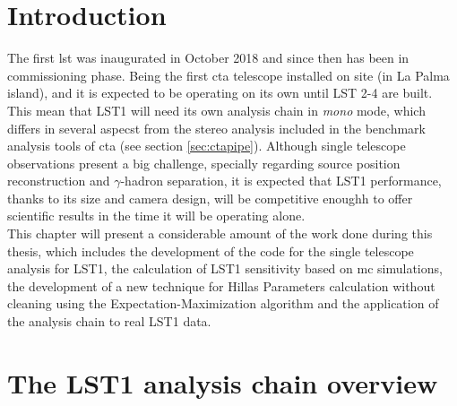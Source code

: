 \documentclass[main.tex]{subfiles}
\begin{document}
\glsresetall

\section{Introduction}

The first \gls{lst} was inaugurated in October 2018 and since then has been in commissioning phase. Being the first \gls{cta} telescope installed on site (in La Palma island), and it is expected to be operating on its own until LST 2-4 are built. This mean that LST1 will need its own analysis chain in \textit{mono} mode, which differs in several aspecst from the stereo analysis included in the benchmark analysis tools of \gls{cta} (see section \ref{sec:ctapipe}). Although single telescope observations present a big challenge, specially regarding source position reconstruction and $\gamma$-hadron separation, it is expected that LST1 performance, thanks to its size and camera design, will be competitive enoughh to offer scientific results in the time it will be operating alone.\\
This chapter will present a considerable amount of the work done during this thesis, which includes the development of the code for the single telescope analysis for LST1, the calculation of LST1 sensitivity based on \gls{mc} simulations, the development of a new technique for Hillas Parameters calculation without cleaning using the Expectation-Maximization algorithm and the application of the analysis chain to real LST1 data. 

\section{The LST1 analysis chain overview}
\end{document}
